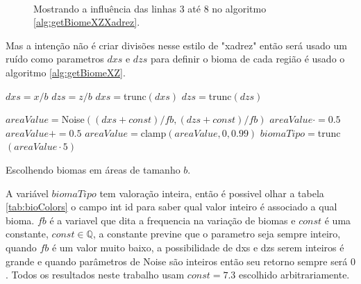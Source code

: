  
\begin{figure}[H]
     \centering
     \hspace{0.1cm}
     \\
     
     \caption{Mostrando a influência das linhas 3 até 8 no algoritmo \ref{alg:getBiomeXZXadrez}.}
     
     \label{fig:ssxadrez}
\end{figure}

Mas a intenção não é criar divisões nesse estilo de "xadrez" então será usado um 
ruído como parametros $dxs$ e $dzs$ para definir o bioma de cada região é usado
o algoritmo \ref{alg:getBiomeXZ}.

\begin{algorithm}[H]\label{alg:getBiomeXZ}
    $dxs = x/b$\;
    $dzs = z/b$\;
    $dxs = $trunc$(dxs)$\;
    $dzs = $trunc$(dzs)$\;
    
    $areaValue = $Noise$((dxs + const)/fb, (dzs + const)/fb)$\;
    $areaValue \cdot = 0.5$\;
    $areaValue += 0.5$\;
    $areaValue = $clamp$(areaValue, 0, 0.99)$\;
    $biomaTipo = $trunc$(areaValue \cdot 5)$\;
    \caption{Escolhendo biomas em áreas de tamanho $b$.}
\end{algorithm}

A variável $biomaTipo$ tem valoração inteira, então é possivel olhar a tabela \ref{tab:bioColors}
o campo int id para saber qual valor inteiro é associado a qual bioma.
$fb$ é a variavel que dita a frequencia na variação de biomas e $const$ é uma constante,
$const \in \mathbb{Q}$, a constante previne que o parametro seja sempre inteiro, quando $fb$ é um valor muito baixo,
a possibilidade de dxs e dzs serem inteiros é grande e quando parâmetros de Noise 
são inteiros então seu retorno sempre será $0$ \cite{perlin1985image}. Todos os resultados 
neste trabalho usam $const = 7.3$ escolhido arbitrariamente.


